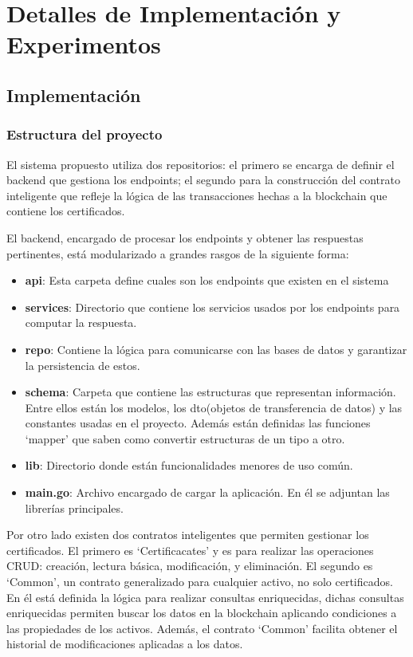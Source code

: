\chapter{Detalles de Implementación y Experimentos}\label{chapter:implementation}


\section{Implementación}

\subsection{Estructura del proyecto}

El sistema propuesto utiliza dos repositorios: el primero se encarga de definir el backend que gestiona los endpoints; el segundo para la construcción del contrato inteligente que refleje la lógica de las transacciones hechas a la blockchain que contiene los certificados.

El backend, encargado de procesar los endpoints y obtener las respuestas pertinentes, está modularizado a grandes rasgos de la siguiente forma:
\begin{itemize}
	\item \textbf{api}: Esta carpeta define cuales son los endpoints que existen en el sistema
	\item \textbf{services}: Directorio que contiene los servicios usados por los endpoints para computar la respuesta.
	\item \textbf{repo}: Contiene la lógica para comunicarse con las bases de datos y garantizar la persistencia de estos.
	\item \textbf{schema}: Carpeta que contiene las estructuras que representan información. Entre ellos están los modelos, los dto(objetos de transferencia de datos) y las constantes usadas en el proyecto. Además están definidas las funciones `mapper' que saben como convertir estructuras de un tipo a otro.
	\item \textbf{lib}: Directorio donde están funcionalidades menores de uso común.
	\item \textbf{main.go}: Archivo encargado de cargar la aplicación. En él se adjuntan las librerías principales.
\end{itemize}

Por otro lado existen dos contratos inteligentes que permiten gestionar los certificados. El primero es `Certificacates' y es para realizar las operaciones CRUD: creación, lectura básica, modificación, y eliminación. El segundo es `Common', un contrato generalizado para cualquier activo, no solo certificados. En él está definida la lógica para realizar consultas enriquecidas, dichas consultas enriquecidas permiten buscar los datos en la blockchain aplicando condiciones a las propiedades de los activos. Además, el contrato `Common' facilita obtener el historial de modificaciones aplicadas a los datos.

